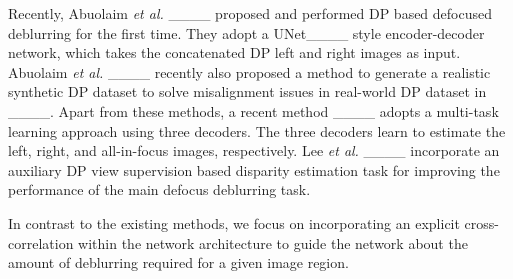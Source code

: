 Recently, Abuolaim \textit{et al.} ____ proposed and performed DP based defocused deblurring for the first time. They adopt a UNet____ style encoder-decoder network, which takes the concatenated DP left and right images as input. Abuolaim \textit{et al.} ____ recently also proposed a method to generate a realistic synthetic DP dataset to solve misalignment issues in real-world DP dataset in ____. Apart from these methods, a recent method ____ adopts a multi-task learning approach using three decoders. The three decoders learn to estimate the left, right, and all-in-focus images, respectively. Lee \textit{et al.} ____ incorporate an auxiliary DP view supervision based disparity estimation task for improving the performance of the main defocus deblurring task.

In contrast to the existing methods, we focus on incorporating an explicit cross-correlation within the network architecture to guide the network about the amount of deblurring required for a given image region.